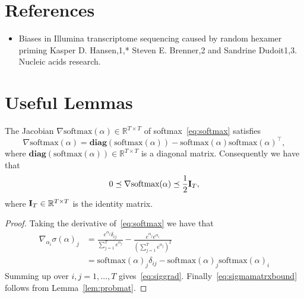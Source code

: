 \documentclass[11pt]{article}
\newcommand{\R}{\mathbb{R}} %
\newcommand{\diag}[1]{\mathbf{diag}\left( #1\right)}
\newcommand{\mI}{{\bf I}}
\begin{document}
\section*{References}

\begin{itemize}
\item Biases in Illumina transcriptome sequencing caused by random
  hexamer priming Kasper D. Hansen,1,* Steven E. Brenner,2 and
  Sandrine Dudoit1,3.  Nucleic acids research.
\end{itemize}


\appendix

\section{Useful Lemmas}


\begin{lemma}
The Jacobian $\nabla \textrm{softmax}(\alpha) \in \R^{T \times T}$ of  softmax~\eqref{eq:softmax} satisfies
\begin{equation}\label{eq:siggrad}
     \nabla \textrm{softmax}(\alpha)  = \diag{\textrm{softmax}(\alpha)} -\textrm{softmax}(\alpha)\textrm{softmax}(\alpha)^\top, 
\end{equation}
where $\diag{\textrm{softmax}(\alpha)} \in \R^{T \times T}$ is a diagonal matrix. Consequently we have that
\begin{equation}\label{eq:sigmamatrxbound}
  0  \preceq \nabla \textrm{softmax}(\alpha) \preceq \frac{1}{2} \mI_T,
\end{equation}
where $\mI_T \in \R^{T \times T}$ is the identity matrix. 
\end{lemma}
\begin{proof}
Taking the derivative of~\eqref{eq:softmax} we have that
    \begin{align*}
    \nabla_{\alpha_i} \sigma (\alpha)_j &=  \frac{e^{\alpha_j} \delta_{ij}}{\sum_{j=1}^T e^{\alpha_j}} -\frac{e^{\alpha_j}e^{\alpha_i}}{(\sum_{j=1}^T e^{\alpha_j})^2}  \\
    &= \textrm{softmax}(\alpha)_j \delta_{ij} - \textrm{softmax}(\alpha)_j\textrm{softmax}(\alpha)_i
\end{align*}
    Summing up over $i,j=1,\ldots, T$ gives~\eqref{eq:siggrad}. Finally~\eqref{eq:sigmamatrxbound} follows from Lemma~\ref{lem:probmat}.
\end{proof}
\end{document}
